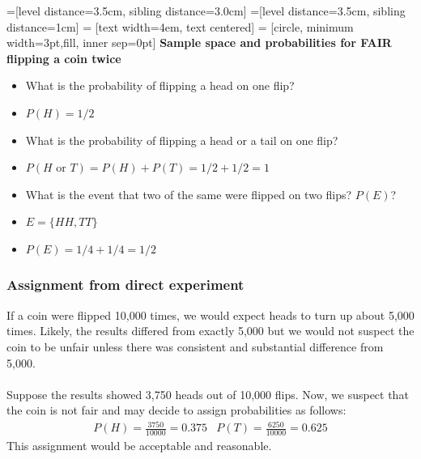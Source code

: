 \documentclass[14pt]{extarticle}
\begin{document}
=[level distance=3.5cm, sibling distance=3.0cm]
=[level distance=3.5cm, sibling distance=1cm]
 = [text width=4em, text centered]
 = [circle, minimum width=3pt,fill, inner sep=0pt]
\textbf{Sample space and probabilities for FAIR flipping a coin twice}\\
\begin{itemize}
	\item What is the probability of flipping a head on one flip?
	\item $P(H) = 1/2$
	\item What is the probability of flipping a head or a tail on one flip?
	\item $P(H \text{ or } T) = P(H) + P(T) = 1/2+1/2 = 1$
	\item What is the event that two of the same were flipped on two flips? $P(E)$?
	\item $E = \{HH, TT\}$
	\item $P(E) = 1/4 + 1/4 = 1/2$
\end{itemize}

\subsubsection{Assignment from direct experiment}
If a coin were flipped 10,000 times, we would expect heads to turn up about 5,000 times. Likely, the results differed from exactly 5,000 but we would not suspect the coin to be unfair unless there was consistent and substantial difference from 5,000.
\\\\ 
Suppose the results showed 3,750 heads out of 10,000 flips. Now, we suspect that the coin is not fair and may decide to assign probabilities as follows:
\begin{align*}
	&P(H) = \frac{3750}{10000}=0.375 & P(T) = \frac{6250}{10000} =0.625&
\end{align*}
This assignment would be acceptable and reasonable. 
\end{document}

